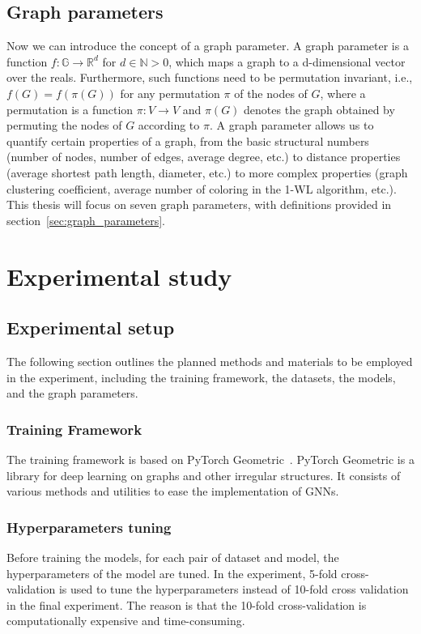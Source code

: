 \documentclass{article}
\begin{document}
\subsection{Graph parameters}
Now we can introduce the concept of a graph parameter. A graph parameter is a function $f: \mathbb{G} \rightarrow \mathbb{R}^d$ for $d\in \mathbb{N} >0$, which maps a graph to a d-dimensional vector over the reals. Furthermore, such functions need to be permutation invariant, i.e., $f(G) = f(\pi(G))$ for any permutation $\pi$ of the nodes of $G$, where a permutation is a function $\pi: V \rightarrow V$ and $\pi(G)$ denotes the graph obtained by permuting the nodes of $G$ according to $\pi$. A graph parameter allows us to quantify certain properties of a graph, from the basic structural numbers (number of nodes, number of edges, average degree, etc.) to distance properties (average shortest path length, diameter, etc.) to more complex properties (graph clustering coefficient, average number of coloring in the 1-WL algorithm, etc.). This thesis will focus on seven graph parameters, with definitions provided in section~\ref{sec:graph_parameters}.

\section{Experimental study}

\subsection{Experimental setup}
The following section outlines the planned methods and materials to be employed in the experiment, including the training framework, the datasets, the models, and the graph parameters.

\subsubsection{Training Framework}
The training framework is based on PyTorch Geometric~\cite{fey2019fast}. PyTorch Geometric is a library for deep learning on graphs and other irregular structures. It consists of various methods and utilities to ease the implementation of GNNs. 

\subsubsection{Hyperparameters tuning}
Before training the models, for each pair of dataset and model, the hyperparameters of the model are tuned. In the experiment, 5-fold cross-validation is used to tune the hyperparameters instead of 10-fold cross validation in the final experiment. The reason is that the 10-fold cross-validation is computationally expensive and time-consuming. 
\end{document}
